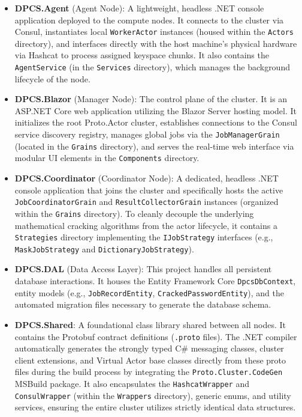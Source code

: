 \begin{itemize}
    \item \textbf{DPCS.Agent} (Agent Node): A lightweight, headless .NET console application deployed to the compute nodes. It connects to the cluster via Consul, instantiates local \verb|WorkerActor| instances (housed within the \verb|Actors| directory), and interfaces directly with the host machine's physical hardware via Hashcat to process assigned keyspace chunks. It also contains the \verb|AgentService| (in the \verb|Services| directory), which manages the background lifecycle of the node.

    \item \textbf{DPCS.Blazor} (Manager Node): The control plane of the cluster. It is an ASP.NET Core web application utilizing the Blazor Server hosting model. It initializes the root Proto.Actor cluster, establishes connections to the Consul service discovery registry, manages global jobs via the \verb|JobManagerGrain| (located in the \verb|Grains| directory), and serves the real-time web interface via modular UI elements in the \verb|Components| directory.

    \item \textbf{DPCS.Coordinator} (Coordinator Node): A dedicated, headless .NET console application that joins the cluster and specifically hosts the active \verb|JobCoordinatorGrain| and \verb|ResultCollectorGrain| instances (organized within the \verb|Grains| directory). To cleanly decouple the underlying mathematical cracking algorithms from the actor lifecycle, it contains a \verb|Strategies| directory implementing the \verb|IJobStrategy| interfaces (e.g., \verb|MaskJobStrategy| and \verb|DictionaryJobStrategy|).

    \item \textbf{DPCS.DAL} (Data Access Layer): This project handles all persistent database interactions. It houses the Entity Framework Core \verb|DpcsDbContext|, entity models (e.g., \verb|JobRecordEntity|, \verb|CrackedPasswordEntity|), and the automated migration files necessary to generate the database schema.
    
    \item \textbf{DPCS.Shared}: A foundational class library shared between all nodes. It contains the Protobuf contract definitions (\verb|.proto| files). The .NET compiler automatically generates the strongly typed C\# messaging classes, cluster client extensions, and Virtual Actor base classes directly from these proto files during the build process by integrating the \verb|Proto.Cluster.CodeGen| MSBuild package. It also encapsulates the \verb|HashcatWrapper| and \verb|ConsulWrapper| (within the \verb|Wrappers| directory), generic enums, and utility services, ensuring the entire cluster utilizes strictly identical data structures.


\end{itemize}
